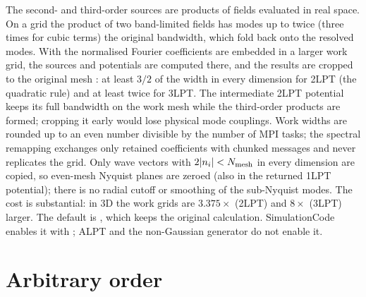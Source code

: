 The second- and third-order sources are products of fields evaluated in real space. On a grid the product of two
band-limited fields has modes up to twice (three times for cubic terms) the original bandwidth, which fold back onto
the resolved modes. With  the normalised Fourier coefficients are embedded in a larger work
grid, the sources and potentials are computed there, and the results are cropped to the original mesh
\cite{Michaux2021}: at least $3/2$ of the width in every dimension for 2LPT (the quadratic rule) and at least twice
for 3LPT. The intermediate 2LPT potential keeps its full bandwidth on the work mesh while the third-order products are
formed; cropping it early would lose physical mode couplings. Work widths are rounded up to an even number divisible by
the number of MPI tasks; the spectral remapping exchanges only retained coefficients with chunked messages and never
replicates the grid. Only wave vectors with $2|n_i|<N_{\rm mesh}$ in every dimension are copied, so even-mesh
Nyquist planes are zeroed (also in the returned 1LPT potential); there is no radial cutoff or smoothing of the
sub-Nyquist modes. The cost is substantial: in 3D the work grids are $3.375\times$ (2LPT) and $8\times$ (3LPT) larger.
The default is , which keeps the original calculation. SimulationCode enables it with
; ALPT and the non-Gaussian generator do not enable it.

\section{Arbitrary order}\label{sec:lpt-arbitrary}

